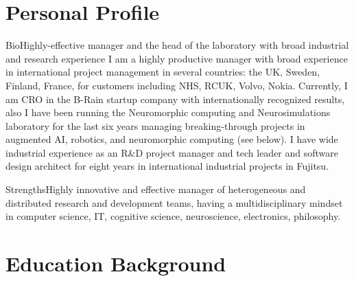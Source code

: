 \documentclass{moderncv}
\begin{document}
%
    \makecvtitle



    \section{Personal Profile}

    \cventry
    {Bio}{Highly-effective manager and the head of the laboratory with broad industrial and research experience}{}{}{}
    {I am a highly productive manager with broad experience in international project management in several countries: the UK, Sweden, Finland, France, for customers including NHS, RCUK, Volvo, Nokia. Currently, I am CRO in the B-Rain startup company with internationally recognized results, also I have been running the Neuromorphic computing and Neurosimulations laboratory for the last six years managing breaking-through projects in augmented AI, robotics, and neuromorphic computing (see below).
    I have wide industrial experience as an R\&D project manager and tech leader and software design architect for eight years in international industrial projects in Fujitsu.}

    \cvitem
    {Strengths}{\small Highly innovative and effective manager of heterogeneous and distributed research and development teams, having a multidisciplinary mindset in computer science, IT, cognitive science, neuroscience, electronics, philosophy.}

    \section{Education Background}
    
    
\end{document}
